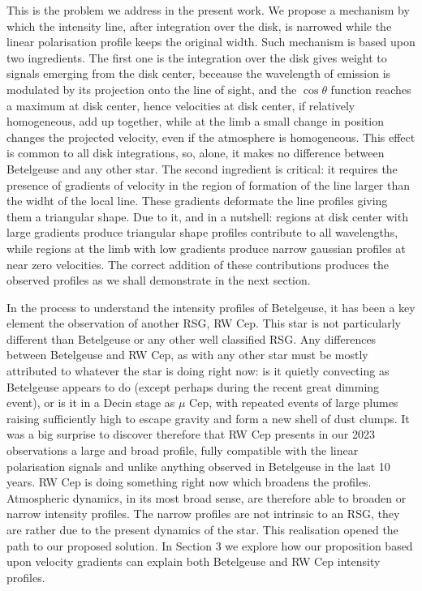\documentclass{/Users/art2/TeX/aanda/aa}
\begin{document}
This is the problem we address in the present work. We propose a mechanism by which the intensity line, after integration over the disk, is narrowed 
while the linear polarisation profile keeps the original width. Such mechanism is based upon two ingredients. The first one is  the integration over the disk gives 
weight to signals emerging from the disk center, beceause the wavelength of emission is modulated by its projection onto the line of sight, and the
$\cos \theta$ function reaches a maximum at disk center, hence velocities at disk center, if relatively homogeneous, add up together, while at 
the limb a small change in position changes the projected velocity, even if the atmosphere is homogeneous. This effect is common to all disk integrations, so, alone, 
it makes no difference between Betelgeuse and any other star. The second ingredient is critical: it requires the presence of gradients of velocity 
in the region of formation of the line larger than the widht of the local line. These gradients deformate the line profiles giving them a triangular 
shape. Due to it, and in a nutshell: regions at disk center with large gradients produce  triangular shape profiles contribute to all wavelengths, while 
regions at the limb with low gradients produce narrow gaussian profiles at near zero velocities. The correct addition of these contributions 
produces the observed profiles as we shall demonstrate in the next section. 

In the process to understand the intensity profiles of Betelgeuse, it has been a key element the observation of another RSG, RW Cep. This star 
is not particularly different than Betelgeuse or any other well classified RSG. Any differences between Betelgeuse and RW Cep, as with any other star 
must be mostly attributed to whatever the star is doing right now: is it quietly convecting as Betelgeuse appears to do (except perhaps during 
the recent great dimming event), or is it in a Decin stage as $\mu$ Cep, with repeated events of large plumes raising sufficiently high to escape 
gravity and form a new shell of dust clumps. It was a big surprise to discover therefore that RW Cep presents in our 2023 observations a large and 
broad profile, fully compatible with the linear polarisation signals and unlike anything observed in Betelgeuse in the last 10 years. RW Cep is 
doing something right now which broadens the profiles. Atmospheric dynamics, in its most broad sense, are therefore able to broaden or narrow intensity 
profiles. The narrow profiles are not intrinsic to an RSG, they are rather due to the present dynamics of the star. This realisation opened the path 
to our proposed solution. In Section 3 we explore how our proposition based upon velocity gradients can explain both Betelgeuse and RW Cep intensity 
profiles.
\end{document}
